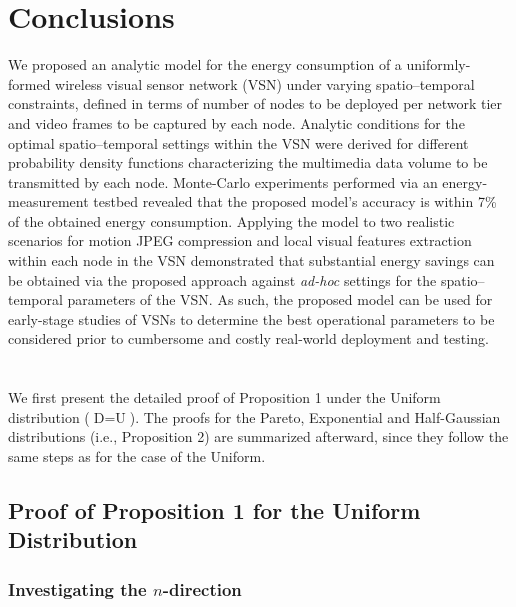 \documentclass[twocolumn,english]{IEEEtran}
\theoremstyle{plain}
\theoremstyle{definition}
\begin{document}
\section{Conclusions\label{sec:Conclusions}}

We proposed an analytic model for the energy consumption of a uniformly-formed
wireless visual sensor network (VSN) under varying spatio--temporal
constraints, defined in terms of number of nodes to be deployed per
network tier and video frames to be captured by each node. Analytic
conditions for the optimal spatio--temporal settings within the VSN
were derived for different probability density functions characterizing
the multimedia data volume to be transmitted by each node. Monte-Carlo
experiments performed via an energy-measurement testbed revealed that
the proposed model's accuracy is within 7\% of the obtained energy
consumption. Applying the model to two realistic scenarios for motion
JPEG compression and local visual features extraction within each
node in the VSN demonstrated that substantial energy savings can be
obtained via the proposed approach against \emph{ad-hoc} settings
for the spatio--temporal parameters of the VSN. As such, the proposed
model can be used for early-stage studies of VSNs to determine the
best operational parameters to be considered prior to cumbersome and
costly real-world deployment and testing.


\appendices{}


\section{\label{sec:Appendix-I}}

We first present the detailed proof of Proposition 1 under the Uniform
distribution ($\text{D}=\text{U}$). The proofs for the Pareto, Exponential
and Half-Gaussian distributions (i.e., Proposition 2) are summarized
afterward, since they follow the same steps as for the case of the
Uniform.


\subsection{Proof of Proposition 1 for the Uniform Distribution\label{sub:Appendix-Uniform}}


\subsubsection{Investigating the $n$-direction}
\end{document}
